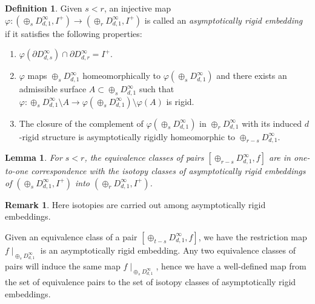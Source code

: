 \documentclass[11pt, a4paper]{amsart}
\newtheorem{lem}[thm]{Lemma}
\theoremstyle{definition}
\newtheorem{rem}[thm]{Remark}
\newtheorem{defn}[thm]{Definition} %
\def\Proof{\noindent{\bf Proof.}\quad}
\begin{document}
 
\begin{defn}\label{defn-qr-emb}
Given $s < r$, an injective map $\varphi: (\oplus_s D^{\infty}_{d,1},I^+)\to  (\oplus_r D^{\infty}_{d,1},I^+)$ is called an \emph{ asymptotically rigid embedding} if it satisfies the following properties:
\begin{enumerate}
    
    \item $\varphi(\partial D^{\infty}_{d,s}) \cap \partial D^{\infty}_{d,r} = I^+$. 
     
        \item $\varphi$ maps $\oplus_s D^{\infty}_{d,1}$ homeomorphically to $\varphi(\oplus_s D^{\infty}_{d,1})$ and there exists an admissible surface $A\subset \oplus_s D^{\infty}_{d,1}$ such that  $\varphi: \oplus_s D^{\infty}_{d,1} \setminus A\to \varphi (\oplus_s D^{\infty}_{d,1}) \setminus \varphi(A)$  is rigid. 
    
    \item \label{defn-qr-emb-cplt} The closure of the complement of $\varphi(\oplus_s D^{\infty}_{d,1})$ in $\oplus_r D^{\infty}_{d,1}$ with its induced $d$-rigid structure is asymptotically rigidly homeomorphic to $\oplus_{r-s} D^{\infty}_{d,1}$. 
    
\end{enumerate}
\end{defn}


\begin{lem}
For $s<r$, the equivalence classes of pairs $[\oplus_{r-s} D^{\infty}_{d,1},f]$ are in one-to-one correspondence with the isotopy classes of asymptotically rigid embeddings of $(\oplus_s D^{\infty}_{d,1},I^+)$ into $(\oplus_r D^{\infty}_{d,1},I^+)$. 
\end{lem}
\begin{rem}
Here isotopies are carried out among asymptotically rigid embeddings.
\end{rem}

\Proof Given an equivalence class of a pair $[\oplus_{t-s} D^{\infty}_{d,1},f]$, we have the restriction map $f\mid_{\oplus_s D^{\infty}_{d,1}}$ is an asymptotically rigid embedding. Any two equivalence classes of pairs will induce the same map $f\mid_{\oplus_s D^{\infty}_{d,1}}$, hence we have a well-defined map from the set of equivalence pairs to the set of isotopy classes of asymptotically rigid embeddings.
\end{document}
